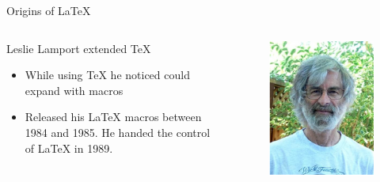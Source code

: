 \documentclass[aspectratio=169]{beamer}
\begin{document}
\begin{frame}{Origins of \LaTeX}
    \begin{columns}
    \small
    \begin{column}{0.8\textwidth}
        Leslie Lamport extended TeX
        \begin{itemize}
            \item While using TeX he noticed could expand with macros
            \item Released his LaTeX macros between 1984 and 1985. He handed the control of \LaTeX{} in 1989.
        \end{itemize}
    \end{column}
            
    \begin{column}{0.2\textwidth}
        \begin{figure}
        \centering
            \includegraphics[scale=0.12]{images/LeslieLamport_2.jpg}
        \end{figure}
    \end{column}
    \normalsize                
    \end{columns}

\end{frame}
\end{document}
